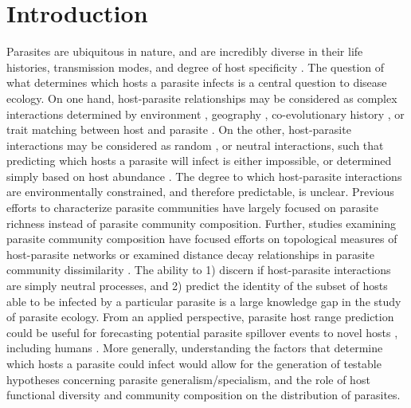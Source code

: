 \documentclass[12pt]{article}
\begin{document}
 
\section*{Introduction}


Parasites are ubiquitous in nature, and are incredibly diverse in their life histories, transmission modes, and degree of host specificity \citep{poulin2011}. The question of what determines which hosts a parasite infects is a central question to disease ecology. On one hand, host-parasite relationships may be considered as complex interactions determined by environment \citep{locke2013}, geography \citep{nieberding2008}, co-evolutionary history \citep{krasnov2012}, or trait matching between host and parasite \citep{rohr2013}. On the other, host-parasite interactions may be considered as random \cite{kennedy2009}, or neutral interactions, such that predicting which hosts a parasite will infect is either impossible, or determined simply based on host abundance \citep{canard2014}. The degree to which host-parasite interactions are environmentally constrained, and therefore predictable, is unclear. Previous efforts to characterize parasite communities have largely focused on parasite richness \citep{arneberg2002,nunn2003,ezenwa2006,poulin1997} instead of parasite community composition. Further, studies examining parasite community composition have focused efforts on topological measures of host-parasite networks \citep{guegan1994, canard2014, krasnov2012, poulin2010} or examined distance decay relationships in parasite community dissimilarity \citep{locke2012, locke2013, poulin2003}. The ability to 1) discern if host-parasite interactions are simply neutral processes, and 2) predict the identity of the subset of hosts able to be infected by a particular parasite is a large knowledge gap in the study of parasite ecology. From an applied perspective, parasite host range prediction could be useful for forecasting potential parasite spillover events to novel hosts \citep{colautti2004}, including humans \citep{daszak2000}. More generally, understanding the factors that determine which hosts a parasite could infect would allow for the generation of testable hypotheses concerning parasite generalism/specialism, and the role of host functional diversity and community composition on the distribution of parasites.   \\
\end{document}
